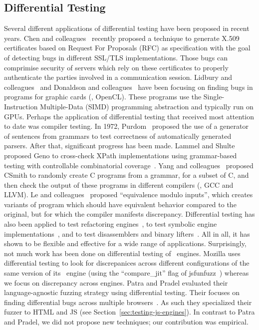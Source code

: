 \documentclass[10pt,conference,anonymous]{IEEEtran}
\begin{document}
\subsection{Differential Testing}
Several different applications of differential testing have been
proposed in recent years. Chen and
colleagues~\cite{Chen:2018:RDT:3180155.3180226} recently proposed a
technique to generate X.509 certificates based on Request For
Proposals (RFC) as specification with the goal of detecting bugs in
different SSL/TLS implementations. Those bugs can comprimise security
of servers which rely on these certificates to properly authenticate
the parties involved in a communication session. Lidbury and
colleagues~\cite{Lidbury:2015:MCF:2737924.2737986} and Donaldson and
colleagues~\cite{Donaldson:2017:ATG:3152284.3133917} have been
focusing on finding bugs in programs for graphic cards (\eg{},
OpenCL). These programs use the Single-Instruction Multiple-Data
(SIMD) programming abstraction and typically run on GPUs.  Perhaps the
application of differential testing that received most attention to
date was compiler testing. In 1972, Purdom~\cite{Purdom1972} proposed
the use of a generator of sentences from grammars to test correctness
of automatically generated parsers. After that, significant progress
has been made. Lammel and Shulte proposed Geno to cross-check XPath
implementations using grammar-based testing with controllable
combinatorial coverage~\cite{10.1007/11754008_2}. Yang and
colleagues~\cite{Yang:2011:FUB:1993498.1993532} proposed CSmith to
randomly create C programs from a grammar, for a subset of C, and then
check the output of these programs in different compilers (\eg{}, GCC
and LLVM). Le and colleagues~\cite{Le:2014:CVV:2594291.2594334}
proposed ``equivalence modulo inputs'', which creates variants of
program which should have equivalent behavior compared to the
original, but for which the compiler manifests
discrepancy. Differential testing has also been applied to test
refactoring engines~\cite{Daniel:2007:ATR:1287624.1287651}, to test
symbolic engine implementations~\cite{Kapus:2017:ATS:3155562.3155636},
and to test disassemblers and binary
lifters~\cite{Paleari:2010:NDD:1831708.1831741,Kim:2017:TIR:3155562.3155609}. All
in all, it has shown to be flexible and effective for a wide range of
applications. Surprisingly, not much work has been done on
differential testing of \js\ engines. Mozilla uses differential
testing to look for discrepanices across different configurations of
the same version of its \smonkey\ engine (using the ``compare\_jit''
flag of jsfunfuzz~\cite{jsfunfuzz}) whereas we focus on discrepancy
across engines. Patra and Pradel evaluated their language-agnostic
fuzzing strategy using differential testing. Their focuses on finding
differential bugs across multiple
browsers~\cite{patra2016learning}. As such they specialized their
fuzzer to HTML and JS (see Section~\ref{sec:testing-js-engines}). In
contrast to Patra and Pradel, we did not propose new techniques; our
contribution was empirical.
\end{document}
